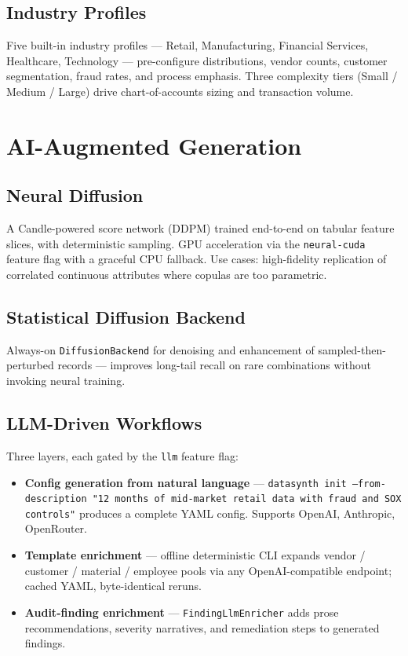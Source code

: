 \documentclass[11pt,a4paper]{article}
\begin{document}
\subsection{Industry Profiles}

Five built-in industry profiles --- Retail, Manufacturing, Financial Services,
Healthcare, Technology --- pre-configure distributions, vendor counts,
customer segmentation, fraud rates, and process emphasis. Three complexity
tiers (Small / Medium / Large) drive chart-of-accounts sizing and
transaction volume.

\newpage
\section{AI-Augmented Generation}

\subsection{Neural Diffusion}

A Candle-powered score network (DDPM) trained end-to-end on tabular feature
slices, with deterministic sampling. GPU acceleration via the
\texttt{neural-cuda} feature flag with a graceful CPU fallback. Use cases:
high-fidelity replication of correlated continuous attributes where copulas
are too parametric.

\subsection{Statistical Diffusion Backend}

Always-on \texttt{DiffusionBackend} for denoising and enhancement of
sampled-then-perturbed records --- improves long-tail recall on rare
combinations without invoking neural training.

\subsection{LLM-Driven Workflows}

Three layers, each gated by the \texttt{llm} feature flag:

\begin{itemize}[leftmargin=1.2em, itemsep=3pt]
  \item \textbf{Config generation from natural language} ---
        \texttt{datasynth init --from-description "12 months of mid-market
        retail data with fraud and SOX controls"} produces a complete YAML
        config. Supports OpenAI, Anthropic, OpenRouter.
  \item \textbf{Template enrichment} --- offline deterministic CLI expands
        vendor / customer / material / employee pools via any
        OpenAI-compatible endpoint; cached YAML, byte-identical reruns.
  \item \textbf{Audit-finding enrichment} --- \texttt{FindingLlmEnricher}
        adds prose recommendations, severity narratives, and remediation
        steps to generated findings.
\end{itemize}
\end{document}
